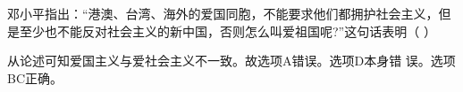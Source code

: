 \question 邓小平指出：``港澳、台湾、海外的爱国同胞，不能要求他们都拥护社会主义，但是至少也不能反对社会主义的新中国，否则怎么叫爱祖国呢?''这句话表明（
）
\par{}
\begin{solution}从论述可知爱国主义与爱社会主义不一致。故选项A错误。选项D本身错
误。选项BC正确。
\end{solution}
